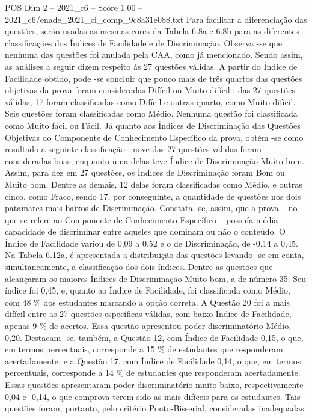 \begin{textsample}{POS Dim 2 – 2021\_c6 – Score 1.00 – 2021\_c6/enade\_2021\_ci\_comp\_9c8a31e088.txt}
Para facilitar a diferenciação das questões, serão usadas as mesmas cores da Tabela 6.8a e 6.8b para as diferentes classificações dos Índices de Facilidade e de Discriminação.
Observa -se que nenhuma das questões foi anulada pela CAA, como já mencionado.
Sendo assim, as análises a seguir dizem respeito às 27 questões válidas.
A partir do Índice de Facilidade obtido, pode -se concluir que pouco mais de três quartos das questões objetivas da prova foram consideradas Difícil ou Muito difícil : das 27 questões válidas, 17 foram classificadas como Difícil e outras quarto, como Muito difícil.
Seis questões foram classificadas como Médio.
Nenhuma questão foi classificada como Muito fácil ou Fácil.
Já quanto aos Índices de Discriminação das Questões Objetivas do Componente de Conhecimento Específico da prova, obtém -se como resultado a seguinte classificação : nove das 27 questões válidas foram consideradas boas, enquanto uma delas teve Índice de Discriminação Muito bom.
Assim, para dez em 27 questões, os Índices de Discriminação foram Bom ou Muito bom.
Dentre as demais, 12 delas foram classificadas como Médio, e outras cinco, como Fraco, sendo 17, por conseguinte, a quantidade de questões nos dois patamares mais baixos de Discriminação.
Constata -se, assim, que a prova – no que se refere ao Componente de Conhecimento Específico – possuía média capacidade de discriminar entre aqueles que dominam ou não o conteúdo.
O Índice de Facilidade variou de 0,09 a 0,52 e o de Discriminação, de -0,14 a 0,45.
Na Tabela 6.12a, é apresentada a distribuição das questões levando -se em conta, simultaneamente, a classificação dos dois índices.
Dentre as questões que alcançaram os maiores Índices de Discriminação Muito bom, a de número 35.
Seu índice foi 0,45, e, quanto ao Índice de Facilidade, foi classificada como Médio, com 48 \% dos estudantes marcando a opção correta.
A Questão 20 foi a mais difícil entre as 27 questões específicas válidas, com baixo Índice de Facilidade, apenas 9 \% de acertos.
Essa questão apresentou poder discriminatório Médio, 0,20.
Destacam -se, também, a Questão 12, com Índice de Facilidade 0,15, o que, em termos percentuais, corresponde a 15 \% de estudantes que responderam acertadamente, e a Questão 17, com Índice de Facilidade 0,14, o que, em termos percentuais, corresponde a 14 \% de estudantes que responderam acertadamente.
Essas questões apresentaram poder discriminatório muito baixo, respectivamente 0,04 e -0,14, o que comprova terem sido as mais difíceis para os estudantes.
Tais questões foram, portanto, pelo critério Ponto-Bisserial, consideradas inadequadas.

\end{textsample}
